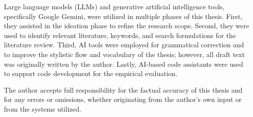 
Large language models (LLMs) and generative artificial intelligence tools, specifically Google Gemini, were utilized in multiple phases of this thesis. First, they assisted in the ideation phase to refine the research scope. Second, they were used to identify relevant literature, keywords, and search formulations for the literature review. Third, AI tools were employed for grammatical correction and to improve the stylistic flow and vocabulary of the thesis; however, all draft text was originally written by the author. Lastly, AI-based code assistants were used to support code development for the empirical evaluation.

The author accepts full responsibility for the factual accuracy of this thesis and for any errors or omissions, whether originating from the author's own input or from the systems utilized.